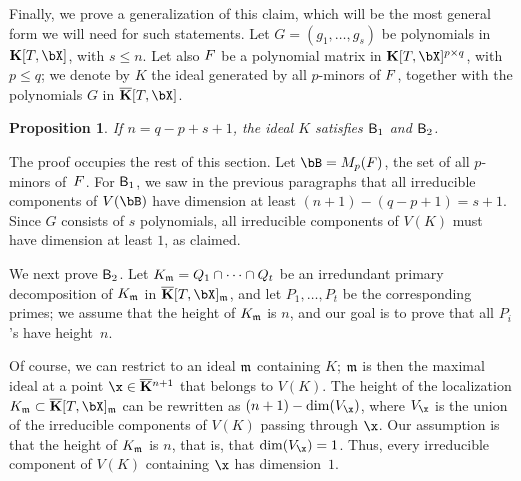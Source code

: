 \documentclass[12pt]{article}
\newtheorem{proposition}[definition]{Proposition}
\begin{document}


Finally, we prove a generalization of this claim, which will be the
most general form we will need for such statements. Let
$G=(g_1,\dots,g_s)$ be polynomials in $\KK[T,\bX]$, with $s \le
n$. Let also ${F}$ be a polynomial matrix in $\KK[T,\bX]^{p \times
  q}$, with $p \le q$; we denote by $K$ the ideal generated by all
$p$-minors of ${F}$, together with the polynomials $G$ in
$\KKbar[T,\bX]$.

\begin{proposition}\label{prop:KH1H2}
  If $n=q-p+s+1$, the ideal $K$ satisfies $\mathsf{B}_1$ and $\mathsf{B}_2$.
\end{proposition}

The proof occupies the rest of this section. Let $\bB=M_p(\mF)$, the
set of all $p$-minors of~${F}$. For $\mathsf{B}_1$, we saw in the previous
paragraphs that all irreducible components of $V(\bB)$ have dimension
at least $(n+1)-(q-p+1)=s+1$. Since $G$ consists of $s$ polynomials,
all irreducible components of $V(K)$ must have dimension at least $1$,
as claimed.

We next prove $\mathsf{B}_2$. Let $K_{\mathfrak{m}}=Q_1 \cap \cdots \cap Q_t$ be an
irredundant primary decomposition of $K_{\mathfrak{m}}$ in $\KKbar[T,\bX]_\m$, and
let $P_1,\dots,P_t$ be the corresponding primes; we assume that the
height of $K_{\mathfrak{m}}$ is $n$, and our goal is to prove that all $P_i$'s
have height~$n$.

Of course, we can restrict to an ideal $\mathfrak{m}$ containing $K$; $\mathfrak{m}$ is
then the maximal ideal at a point $\x \in \KKbar{}^{n+1}$ that belongs
to $V(K)$. The height of the localization $K_\m \subset
\KKbar[T,\bX]_\m$ can be rewritten as $(n+1)-\dim(V_\x)$, where $V_\x$
is the union of the irreducible components of $V(K)$ passing through
$\x$. Our assumption is that the height of $K_{\mathfrak{m}}$ is $n$, that is,
that $\dim(V_\x)=1$. Thus, every irreducible component of $V(K)$
containing $\x$ has dimension~$1$.
\end{document}
